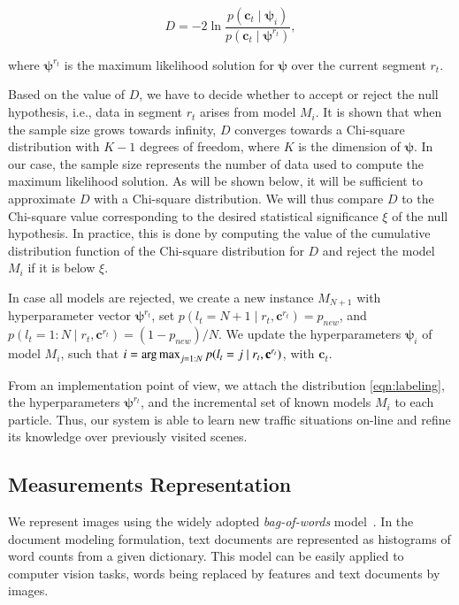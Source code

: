 \begin{equation}
\label{eqn:statistic}
D = -2\ln\frac{p(\mathbf{c}_t\mid \boldsymbol{\psi}_i)}{p(\mathbf{c}_t\mid
\boldsymbol{\psi}^{r_t})},
\end{equation}

where $\boldsymbol{\psi}^{r_t}$ is the maximum likelihood solution for
$\boldsymbol{\psi}$ over the current segment $r_t$.

Based on the value of $D$, we have to decide whether to accept or reject the
null hypothesis, i.e., data in segment $r_t$ arises from model $M_i$. It is
shown that when the sample size grows towards infinity, $D$ converges towards a
Chi-square distribution with $K-1$ degrees of freedom, where $K$ is the
dimension of $\boldsymbol{\psi}$. In our case, the sample size represents the
number of data used to compute the maximum likelihood solution. As will be
shown below, it will be sufficient to approximate $D$ with a Chi-square
distribution. We will thus compare $D$ to the Chi-square value corresponding to
the desired statistical significance $\xi$ of the null hypothesis. In practice,
this is done by computing the value of the cumulative distribution
function of the Chi-square distribution for $D$ and reject the model
$M_i$ if it is below $\xi$.

In case all models are rejected, we create a new instance $M_{N+1}$
with hyperparameter vector $\boldsymbol{\psi}^{r_t}$, set $p(l_t=N+1\mid r_t,
\mathbf{c}^{r_t})=p_{new}$, and $p(l_t=1:N\mid r_t,\mathbf{c}^{r_t})=
(1-p_{new})/N$. We update the hyperparameters $\boldsymbol{\psi}_i$ of model
$M_i$, such that $i=\operatorname*{arg\,max}_{j=1:N}p(l_t=j\mid
r_t,\mathbf{c}^{r_t})$, with $\mathbf{c}_t$.

From an implementation point of view, we attach the distribution
\eqref{eqn:labeling}, the hyperparameters $\boldsymbol{\psi}^{r_t}$, and the
incremental set of known models $M_i$ to each particle. Thus, our system is able
to learn new traffic situations on-line and refine its knowledge over
previously visited scenes.

\subsection{Measurements Representation}
We represent images using the widely adopted \emph{bag-of-words}
model~\cite{sivic03video}. In the document modeling formulation, text documents
are represented as histograms of word counts from a given dictionary. This model
can be easily applied to computer vision tasks, words being replaced by features
and text documents by images.

